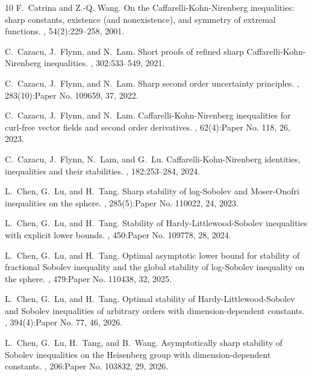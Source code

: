 \documentclass[a4paper,12pt]{article}
\theoremstyle{plain}
\theoremstyle{definition}
\theoremstyle{remark}
\numberwithin{equation}{section}
\begin{document}
\begin{thebibliography}{10}
F.~Catrina and Z.-Q. Wang.
\newblock On the {C}affarelli-{K}ohn-{N}irenberg inequalities: sharp constants,
  existence (and nonexistence), and symmetry of extremal functions.
, 54(2):229--258, 2001.

C.~Cazacu, J.~Flynn, and N.~Lam.
\newblock Short proofs of refined sharp {C}affarelli-{K}ohn-{N}irenberg
  inequalities.
, 302:533--549, 2021.

C.~Cazacu, J.~Flynn, and N.~Lam.
\newblock Sharp second order uncertainty principles.
, 283(10):Paper No. 109659, 37, 2022.

C.~Cazacu, J.~Flynn, and N.~Lam.
\newblock Caffarelli-{K}ohn-{N}irenberg inequalities for curl-free vector
  fields and second order derivatives.
, 62(4):Paper No. 118,
  26, 2023.

C.~Cazacu, J.~Flynn, N.~Lam, and G.~Lu.
\newblock Caffarelli-{K}ohn-{N}irenberg identities, inequalities and their
  stabilities.
, 182:253--284, 2024.

L.~Chen, G.~Lu, and H.~Tang.
\newblock Sharp stability of log-{S}obolev and {M}oser-{O}nofri inequalities on
  the sphere.
, 285(5):Paper No. 110022, 24, 2023.

L.~Chen, G.~Lu, and H.~Tang.
\newblock Stability of {H}ardy-{L}ittlewood-{S}obolev inequalities with
  explicit lower bounds.
, 450:Paper No. 109778, 28, 2024.

L.~Chen, G.~Lu, and H.~Tang.
\newblock Optimal asymptotic lower bound for stability of fractional {S}obolev
  inequality and the global stability of log-{S}obolev inequality on the
  sphere.
, 479:Paper No. 110438, 32, 2025.

L.~Chen, G.~Lu, and H.~Tang.
\newblock Optimal stability of {H}ardy-{L}ittlewood-{S}obolev and {S}obolev
  inequalities of arbitrary orders with dimension-dependent constants.
, 394(4):Paper No. 77, 46, 2026.

L.~Chen, G.~Lu, H.~Tang, and B.~Wang.
\newblock Asymptotically sharp stability of {S}obolev inequalities on the
  {H}eisenberg group with dimension-dependent constants.
, 206:Paper No. 103832, 29, 2026.


\end{thebibliography}
\end{document}
